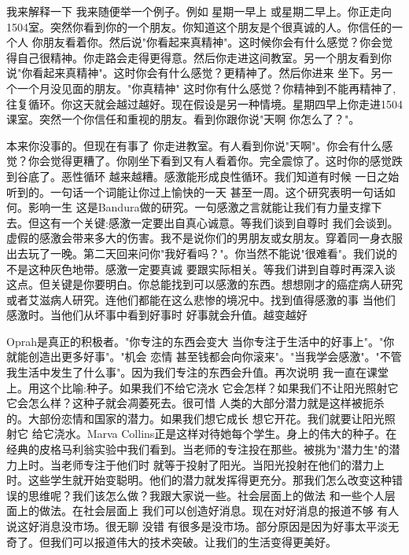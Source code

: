 我来解释一下 我来随便举一个例子。例如 星期一早上 或星期二早上。你正走向1504室。突然你看到你的一个朋友。你知道这个朋友是个很真诚的人。你信任的一个人 你朋友看着你。然后说"你看起来真精神"。这时候你会有什么感觉？你会觉得自己很精神。你走路会走得更得意。然后你走进这间教室。另一个朋友看到你说"你看起来真精神"。这时你会有什么感觉？更精神了。然后你进来 坐下。另一个一个月没见面的朋友。"你真精神" 这时你有什么感觉？你精神到不能再精神了,往复循环。你这天就会越过越好。现在假设是另一种情境。星期四早上你走进1504课室。突然一个你信任和重视的朋友。看到你跟你说"天啊 你怎么了？"。 

本来你没事的。但现在有事了 你走进教室。有人看到你说"天啊"。你会有什么感觉？你会觉得更糟了。你刚坐下看到又有人看着你。完全震惊了。这时你的感觉跌到谷底了。恶性循环 越来越糟。感激能形成良性循环。我们知道有时候 一日之始听到的。一句话一个词能让你过上愉快的一天 甚至一周。这个研究表明一句话如何。影响一生 这是Bandura做的研究。一句感激之言就能让我们有力量支撑下去。但这有一个关键:感激一定要出自真心诚意。等我们谈到自尊时 我们会谈到。虚假的感激会带来多大的伤害。我不是说你们的男朋友或女朋友。穿着同一身衣服出去玩了一晚。第二天回来问你"我好看吗？"。你当然不能说"很难看"。我们说的不是这种灰色地带。感激一定要真诚 要跟实际相关。等我们讲到自尊时再深入谈这点。但关键是你要明白。你总能找到可以感激的东西。想想刚才的癌症病人研究 或者艾滋病人研究。连他们都能在这么悲惨的境况中。找到值得感激的事 当他们感激时。当他们从坏事中看到好事时 好事就会升值。越变越好 

Oprah是真正的积极者。"你专注的东西会变大 当你专注于生活中的好事上"。"你就能创造出更多好事"。"机会 恋情 甚至钱都会向你滚来"。"当我学会感激"。"不管我生活中发生了什么事"。因为我们专注的东西会升值。再次说明 我一直在课堂上。用这个比喻:种子。如果我们不给它浇水 它会怎样？如果我们不让阳光照射它 它会怎么样？这种子就会凋萎死去。很可惜 人类的大部分潜力就是这样被扼杀的。大部份恋情和国家的潜力。如果我们想它成长 想它开花。我们就要让阳光照射它 给它浇水。Marva Collins正是这样对待她每个学生。身上的伟大的种子。在经典的皮格马利翁实验中我们看到。当老师的专注投在那些。被挑为"潜力生"的潜力上时。当老师专注于他们时 就等于投射了阳光。当阳光投射在他们的潜力上时。这些学生就开始变聪明。他们的潜力就发挥得更充分。那我们怎么改变这种错误的思维呢？我们该怎么做？我跟大家说一些。社会层面上的做法 和一些个人层面上的做法。在社会层面上 我们可以创造好消息。现在对好消息的报道不够 有人说这好消息没市场。很无聊 没错 有很多是没市场。部分原因是因为好事太平淡无奇了。但我们可以报道伟大的技术突破。让我们的生活变得更美好。 

